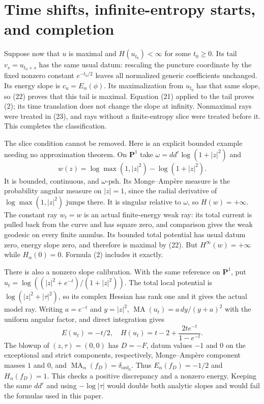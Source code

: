 \documentclass[11pt]{article}
\newcommand{\MA}{\operatorname{MA}}
\newcommand{\ord}{\operatorname{ord}}
\begin{document}
\section{Time shifts, infinite-entropy starts, and completion}
Suppose now that $u$ is maximal and $H(u_{t_0})<\infty$ for some
$t_0\geq0$. Its tail $v_s=u_{t_0+s}$ has the same usual datum:
rescaling the puncture coordinate by the fixed nonzero constant
$e^{-t_0/2}$ leaves all normalized generic coefficients unchanged.
Its energy slope is $c_u=E_\alpha(\phi)$. Its maximalization from
$u_{t_0}$ has that same slope, so (22) proves that this tail is
maximal. Equation (21) applied to the tail proves (2); its time
translation does not change the slope at infinity. Nonmaximal rays
were treated in (23), and rays without a finite-entropy slice were
treated before it. This completes the classification.

The slice condition cannot be removed. Here is an explicit bounded
example needing no approximation theorem. On $\mathbf P^1$ take
$\omega=dd^c\log(1+|z|^2)$ and
\[
 w(z)=\log\max(1,|z|^2)-\log(1+|z|^2).
\]
It is bounded, continuous, and $\omega$-psh. Its Monge--Amp\`ere
measure is the probability angular measure on $|z|=1$, since the
radial derivative of $\log\max(1,|z|^2)$ jumps there. It is
singular relative to $\omega$, so $H(w)=+\infty$. The constant
ray $w_t=w$ is an actual finite-energy weak ray: its total current
is pulled back from the curve and has square zero, and comparison
gives the weak geodesic on every finite annulus. Its bounded total
potential has usual datum zero, energy slope zero, and therefore is
maximal by (22). But $H^\infty(w)=+\infty$ while
$H_\alpha(0)=0$. Formula (2) includes it exactly.

There is also a nonzero slope calibration. With the same reference
on $\mathbf P^1$, put
$u_t=\log((|z|^2+e^{-t})/(1+|z|^2))$.
The total local potential is $\log(|z|^2+|\tau|^2)$, so its
complex Hessian has rank one and it gives the actual model ray.
Writing $a=e^{-t}$ and $y=|z|^2$,
$\MA(u_t)=a\,dy/(y+a)^2$ with the uniform angular factor, and
direct integration gives
\[
 E(u_t)=-t/2,\quad
 H(u_t)=t-2+\frac{2te^{-t}}{1-e^{-t}}.
\]
The blowup of $(z,\tau)=(0,0)$ has $D=-F$, datum values $-1$
and $0$ on the exceptional and strict components, respectively,
Monge--Amp\`ere component masses $1$ and $0$, and
$\MA_\alpha(f_D)=\delta_{\ord_0}$.
Thus $E_\alpha(f_D)=-1/2$ and $H_\alpha(f_D)=1$.
This checks a positive discrepancy and a nonzero energy. Keeping
the same $dd^c$ and using $-\log|\tau|$ would double both analytic
slopes and would fail the formulas used in this paper.
\end{document}
